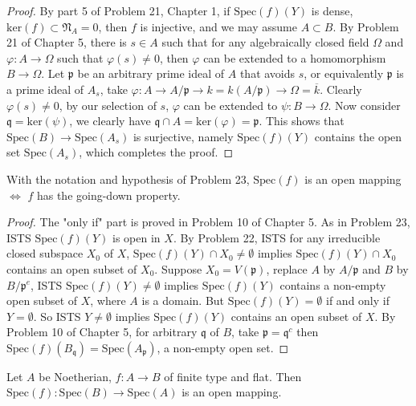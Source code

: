 \documentclass{solution}
\begin{document}
\begin{proof}
    By part 5 of Problem 21, Chapter 1, if $\mathrm{Spec}(f)(Y)$ is dense, $\mathrm{ker}(f) \subset \mathfrak{N}_A = 0$, then $f$ is injective, and we may assume $A \subset B$. By Problem 21 of Chapter 5, there is $s \in A$ such that for any algebraically closed field $\Omega$ and $\varphi: A \rightarrow \Omega$ such that $\varphi(s) \ne 0$, then $\varphi$ can be extended to a homomorphism $B \rightarrow \Omega$. Let $\mathfrak{p}$ be an arbitrary prime ideal of $A$ that avoids $s$, or equivalently $\mathfrak{p}$ is a prime ideal of $A_s$, take $\varphi: A \rightarrow A / \mathfrak{p} \rightarrow k = k(A / \mathfrak{p}) \rightarrow \Omega = \overline{k}$. Clearly $\varphi(s) \ne 0$, by our selection of $s$, $\varphi$ can be extended to $\psi: B \rightarrow \Omega$. Now consider $\mathfrak{q} = \mathrm{ker}(\psi)$, we clearly have $\mathfrak{q} \cap A = \mathrm{ker}(\varphi) = \mathfrak{p}$. This shows that $\mathrm{Spec}(B) \rightarrow \mathrm{Spec}(A_s)$ is surjective, namely $\mathrm{Spec}(f)(Y)$ contains the open set $\mathrm{Spec}(A_s)$, which completes the proof.
\end{proof}

\begin{problem}
    With the notation and hypothesis of Problem 23, $\mathrm{Spec}(f)$ is an open mapping $\Leftrightarrow$ $f$ has the going-down property.
\end{problem}

\begin{proof}
    The "only if" part is proved in Problem 10 of Chapter 5. As in Problem 23, ISTS $\mathrm{Spec}(f)(Y)$ is open in $X$. By Problem 22, ISTS for any irreducible closed subspace $X_0$ of $X$, $\mathrm{Spec}(f)(Y) \cap X_0 \ne \emptyset$ implies $\mathrm{Spec}(f)(Y) \cap X_0$ contains an open subset of $X_0$. Suppose $X_0 = V(\mathfrak{p})$, replace $A$ by $A / \mathfrak{p}$ and $B$ by $B / \mathfrak{p}^e$, ISTS $\mathrm{Spec}(f)(Y) \ne \emptyset$ implies $\mathrm{Spec}(f)(Y)$ contains a non-empty open subset of $X$, where $A$ is a domain. But $\mathrm{Spec}(f)(Y) = \emptyset$ if and only if $Y = \emptyset$. So ISTS $Y \ne \emptyset$ implies $\mathrm{Spec}(f)(Y)$ contains an open subset of $X$. By Problem 10 of Chapter 5, for arbitrary $\mathfrak{q}$ of $B$, take $\mathfrak{p} = \mathfrak{q}^c$ then $\mathrm{Spec}(f)(B_{\mathfrak{q}}) = \mathrm{Spec}(A_{\mathfrak{p}})$, a non-empty open set. 
\end{proof}

\begin{problem}
    Let $A$ be Noetherian, $f: A \rightarrow B$ of finite type and flat. Then $\mathrm{Spec}(f): \mathrm{Spec}(B) \rightarrow \mathrm{Spec}(A)$ is an open mapping.
\end{problem}
\end{document}
